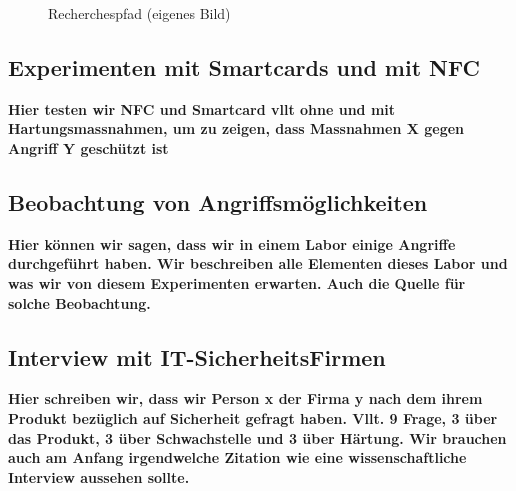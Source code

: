 \begin{landscape}
  \thispagestyle{mylandscape}
  \begin{figure}[h]  
  \centering
         \caption{Recherchespfad (eigenes Bild)}
          \label{fig:diagramfrage}
  \end{figure}
\end{landscape}


\subsection{Experimenten mit Smartcards und mit NFC}
\textbf{Hier testen wir NFC und Smartcard vllt ohne und mit Hartungsmassnahmen, um zu zeigen, dass Massnahmen X gegen
Angriff Y geschützt ist}

\subsection{Beobachtung von Angriffsmöglichkeiten}
\textbf{Hier können wir sagen, dass wir in einem Labor einige Angriffe durchgeführt haben. Wir beschreiben alle Elementen
dieses Labor und was wir von diesem Experimenten erwarten. Auch die Quelle für solche Beobachtung.}

\subsection{Interview mit IT-SicherheitsFirmen}

\textbf{Hier schreiben wir, dass wir Person x der Firma y nach dem ihrem Produkt bezüglich auf Sicherheit gefragt haben.
Vllt. 9 Frage, 3 über das Produkt, 3 über Schwachstelle und 3 über Härtung. Wir brauchen auch am Anfang irgendwelche Zitation
wie eine wissenschaftliche Interview aussehen sollte.}

